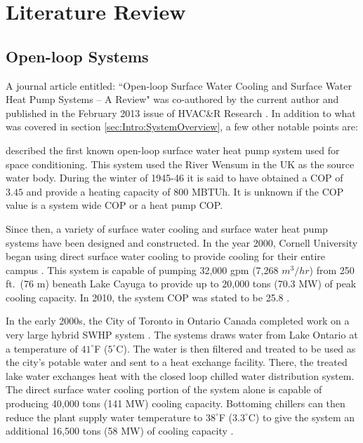 \section{Literature Review}
\label{sec:LitRev}

	\subsection{Open-loop Systems}
	\label{subsec:Intro:LitRev:OpenLoop}

A journal article entitled: ``Open-loop Surface Water Cooling and Surface Water Heat Pump Systems -- A Review" was co-authored by the current author and published in the February 2013 issue of HVAC\&R Research \citep{MitchellSpitler2013}. In addition to what was covered in section \ref{sec:Intro:SystemOverview}, a few other notable points are:
	
\cite{Sumner1948} described the first known open-loop surface water heat pump system used for space conditioning. This system used the River Wensum in the UK as the source water body. During the winter of 1945-46 it is said to have obtained a COP of $3.45$ and provide a heating capacity of 800 MBTUh. It is unknown if the COP value is a system wide COP or a heat pump COP.

Since then, a variety of surface water cooling and surface water heat pump systems have been designed and constructed. In the year 2000, Cornell University began using direct surface water cooling to provide cooling for their entire campus \citep{PeerJoyce2002}. This system is capable of pumping 32,000 gpm (7,268 $m^3/hr$) from 250 ft.\ (76 m) beneath Lake Cayuga to provide up to 20,000 tons (70.3 MW) of peak cooling capacity. In 2010, the system COP was stated to be 25.8 \citep{Peer2012}.

In the early 2000s, the City of Toronto in Ontario Canada completed work on a very large hybrid SWHP system \citep{Heffernan2001}. The systems draws water from Lake Ontario at a temperature of $41^\circ$F ($5^\circ$C). The water is then filtered and treated to be used as the city's potable water and sent to a heat exchange facility. There, the treated lake water exchanges heat with the closed loop chilled water distribution system. The direct surface water cooling portion of the system alone is capable of producing 40,000 tons (141 MW) cooling capacity. Bottoming chillers can then reduce the plant supply water temperature to $38^\circ$F ($3.3^\circ$C) to give the system an additional 16,500 tons (58 MW) of cooling capacity \citep{Eliadis2003}. 

